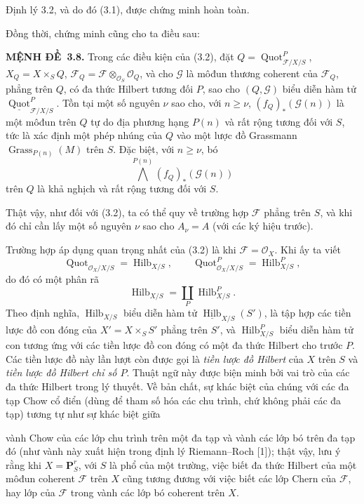 \documentclass[11pt,twoside,openany]{book}
\numberwithin{equation}{section}
\newcommand{\src}[1]{%
  \phantomsection\hypertarget{src:\fgasourceid:#1}{}%
  \marginpar{\raggedleft\footnotesize\sffamily #1}%
}
\newcommand{\fgasourceid}{unset}
\newcommand{\result}[2]{\par\medskip\noindent\textbf{#1\if\relax\detokenize{#2}\relax\else\ #2\fi.}\quad}
\begin{document}
Định lý 3.2, và do đó (3.1), được chứng minh hoàn toàn.

Đồng thời, chứng minh cũng cho ta điều sau:

\result{MỆNH ĐỀ}{3.8} Trong các điều kiện của (3.2), đặt
$Q=\operatorname{Quot}^P_{\mathcal F/X/S}$, $X_Q=X\times_SQ$,
$\mathcal F_Q=\mathcal F\otimes_{\mathcal O_S}\mathcal O_Q$, và cho
$\mathcal G$ là môđun thương coherent của $\mathcal F_Q$, phẳng trên $Q$, có
đa thức Hilbert tương đối $P$, sao cho $(Q,\mathcal G)$ biểu diễn hàm tử
$\underline{\operatorname{Quot}}^P_{\mathcal F/X/S}$. Tồn tại một số nguyên
$\nu$ sao cho, với $n\geq\nu$, $(f_Q)_*(\mathcal G(n))$ là một môđun trên $Q$
tự do địa phương hạng $P(n)$ và rất rộng tương đối với $S$, tức là xác định
một phép nhúng của $Q$ vào một lược đồ Grassmann
$\operatorname{Grass}_{P(n)}(M)$ trên $S$. Đặc biệt, với $n\geq\nu$, bó
\[
\bigwedge^{P(n)}(f_Q)_*(\mathcal G(n))
\]
trên $Q$ là khả nghịch và rất rộng tương đối với $S$.

Thật vậy, như đối với (3.2), ta có thể quy về trường hợp $\mathcal F$ phẳng
trên $S$, và khi đó chỉ cần lấy một số nguyên $\nu$ sao cho $A_\nu=A$ (với các
ký hiệu trước).

Trường hợp áp dụng quan trọng nhất của (3.2) là khi
$\mathcal F=\mathcal O_X$. Khi ấy ta viết
\[
\operatorname{Quot}_{\mathcal O_X/X/S}=\operatorname{Hilb}_{X/S},
\qquad
\operatorname{Quot}^P_{\mathcal O_X/X/S}=\operatorname{Hilb}^P_{X/S},
\]
do đó có một phân rã
\[
\operatorname{Hilb}_{X/S}=\coprod_P\operatorname{Hilb}^P_{X/S}.
\]
Theo định nghĩa, $\operatorname{Hilb}_{X/S}$ biểu diễn hàm tử
$\underline{\operatorname{Hilb}}_{X/S}(S')$, là tập hợp các tiền lược đồ con
đóng của $X'=X\times_SS'$ phẳng trên $S'$, và
$\operatorname{Hilb}^P_{X/S}$ biểu diễn hàm tử con tương ứng với các tiền lược
đồ con đóng có một đa thức Hilbert cho trước $P$. Các tiền lược đồ này lần lượt
còn được gọi là \emph{tiền lược đồ Hilbert} của $X$ trên $S$ và
\emph{tiền lược đồ Hilbert chỉ số $P$}. Thuật ngữ này được biện minh bởi vai
trò của các đa thức Hilbert trong lý thuyết. Về bản chất, sự khác biệt của
chúng với các đa tạp Chow cổ điển (dùng để tham số hóa các chu trình, chứ không
phải các đa tạp) tương tự như sự khác biệt giữa
\src{266}
vành Chow của các lớp chu trình trên một đa tạp và vành các lớp bó trên đa
tạp đó (như vành này xuất hiện trong định lý Riemann--Roch [1]); thật vậy,
lưu ý rằng khi $X=\mathbf P^r_S$, với $S$ là phổ của một trường, việc biết đa
thức Hilbert của một môđun coherent $\mathcal F$ trên $X$ cũng tương đương với
việc biết các lớp Chern của $\mathcal F$, hay lớp của $\mathcal F$ trong vành
các lớp bó coherent trên $X$.
\end{document}
